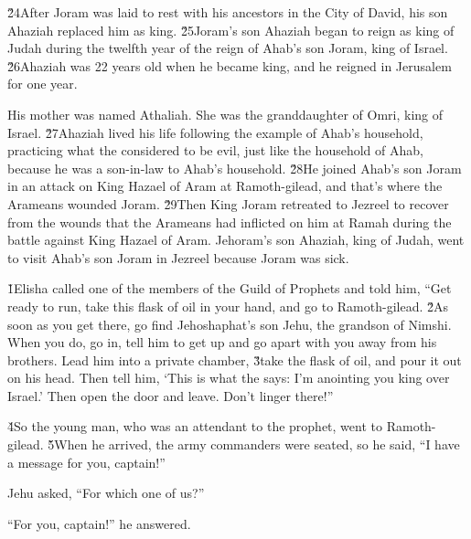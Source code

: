 \v{24}After Joram was laid to rest with his ancestors in the City of David, his son Ahaziah replaced him as king. \v{25}Joram's son Ahaziah began to reign as king of Judah during the twelfth year of the reign of Ahab's son Joram, king of Israel. \v{26}Ahaziah was 22 years old when he became king, and he reigned in Jerusalem for one year.

His mother was named Athaliah. She was the granddaughter of Omri, king of Israel. \v{27}Ahaziah lived his life following the example of Ahab's household, practicing what the  considered to be evil, just like the household of Ahab, because he was a son-in-law to Ahab's household. \v{28}He joined Ahab's son Joram in an attack on King Hazael of Aram at Ramoth-gilead, and that's where the Arameans wounded Joram. \v{29}Then King Joram retreated to Jezreel to recover from the wounds that the Arameans had inflicted on him at Ramah during the battle against King Hazael of Aram. Jehoram's son Ahaziah, king of Judah, went to visit Ahab's son Joram in Jezreel because Joram was sick.

\v{1}Elisha called one of the members of the Guild of Prophets and told him, ``Get ready to run, take this flask of oil in your hand, and go to Ramoth-gilead. \v{2}As soon as you get there, go find Jehoshaphat's son Jehu, the grandson of Nimshi. When you do, go in, tell him to get up and go apart with you away from his brothers. Lead him into a private chamber, \v{3}take the flask of oil, and pour it out on his head. Then tell him, `This is what the  says: I'm anointing you king over Israel.' Then open the door and leave. Don't linger there!''

\v{4}So the young man, who was an attendant to the prophet, went to Ramoth-gilead. \v{5}When he arrived, the army commanders were seated, so he said, ``I have a message for you, captain!''

Jehu asked, ``For which one of us?''

``For you, captain!'' he answered.

